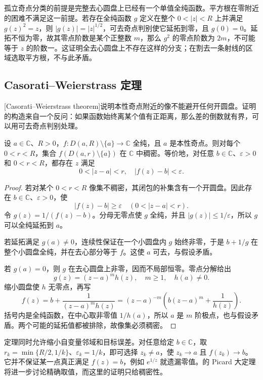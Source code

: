 \ProseParagraphBreak

孤立奇点分类的前提是完整去心圆盘上已经有一个单值全纯函数。平方根在零附近的困难不满足这一前提。若存在全纯函数 \(g\) 定义在整个 \(0<|z|<R\) 上并满足 \(g(z)^2=z\)，则 \(|g(z)|=|z|^{1/2}\)，可去奇点判别使它延拓到零，且 \(g(0)=0\)。延拓不恒为零，故其零点阶数是某个正整数 \(m\)，那么 \(g^2\) 的零点阶数为 \(2m\)，不可能等于 \(z\) 的阶数一。这证明全去心圆盘上不存在这样的分支；在割去一条射线的区域选取平方根，不与此矛盾。

\subsection{Casorati–Weierstrass 定理}
\label{b3:subsec:030204}

[Casorati--Weierstrass theorem]说明本性奇点附近的像不能避开任何开圆盘。证明的构造来自一个反问：如果函数始终离某个值有正距离，那么差的倒数就有界，可以用可去奇点判别处理。

\begin{theorem}\label{b3:thm:03-casorati-weierstrass}
设 \(a\in\mathbb C\)、\(R>0\)，\(f:D(a,R)\setminus\{a\}\to\mathbb C\) 全纯，且 \(a\) 是本性奇点。则对每个 \(0<r<R\)，集合 \(f(D(a,r)\setminus\{a\})\) 在 \(\mathbb C\) 中稠密。等价地，对任意 \(b\in\mathbb C\)、\(\varepsilon>0\) 和 \(0<r<R\)，都存在 \(z\) 满足
\[
 0<|z-a|<r,\quad |f(z)-b|<\varepsilon.
\]
\end{theorem}
\begin{proof}
若对某个 \(0<r<R\) 像集不稠密，其闭包的补集含有一个开圆盘。因此存在 \(b\in\mathbb C\)、\(\varepsilon>0\)，使
\[
 |f(z)-b|\ge\varepsilon\quad(0<|z-a|<r).
\]
令 \(g(z)=1/(f(z)-b)\)。分母无零点使 \(g\) 全纯，并且 \(|g(z)|\le1/\varepsilon\)，所以 \(g\) 可以全纯延拓到 \(a\)。

若延拓满足 \(g(a)\ne0\)，连续性保证在一个小圆盘内 \(g\) 始终非零，于是 \(b+1/g\) 在整个小圆盘全纯，并在去心部分等于 \(f\)。这使 \(a\) 可去，与假设矛盾。

若 \(g(a)=0\)，则 \(g\) 在去心圆盘上非零，因而不局部恒零。零点分解给出
\[
 g(z)=(z-a)^m h(z),\quad m\ge1,\quad h(a)\ne0.
\]
缩小圆盘使 \(h\) 无零点，再写
\[
 f(z)=b+\frac1{(z-a)^m h(z)}
 =(z-a)^{-m}\left(b(z-a)^m+\frac1{h(z)}\right).
\]
括号内是全纯函数，在中心取非零值 \(1/h(a)\)，所以 \(a\) 是 \(m\) 阶极点，也与假设矛盾。两个可能的延拓值都被排除，故像集必须稠密。
\end{proof}

定理同时允许缩小自变量邻域和目标误差。对任意给定 \(b\in\mathbb C\)，取 \(r_k=\min\{R/2,1/k\}\)、\(\varepsilon_k=1/k\)，即可选择 \(z_k\ne a\)，使 \(z_k\to a\) 且 \(f(z_k)\to b\)。它并不保证某一点真正满足 \(f(z)=b\)，例如 \(e^{1/z}\) 就遗漏零值。的 Picard 大定理将进一步讨论精确取值，而这里的证明只给稠密性。

